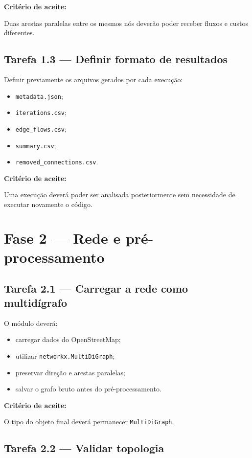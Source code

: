 \documentclass[12pt,a4paper]{article}
\begin{document}
\textbf{Critério de aceite:}

Duas arestas paralelas entre os mesmos nós deverão poder receber fluxos e
custos diferentes.

\subsection{Tarefa 1.3 --- Definir formato de resultados}

Definir previamente os arquivos gerados por cada execução:

\begin{itemize}
    \item \texttt{metadata.json};
    \item \texttt{iterations.csv};
    \item \texttt{edge\_flows.csv};
    \item \texttt{summary.csv};
    \item \texttt{removed\_connections.csv}.
\end{itemize}

\textbf{Critério de aceite:}

Uma execução deverá poder ser analisada posteriormente sem necessidade de
executar novamente o código.

\section{Fase 2 --- Rede e pré-processamento}

\subsection{Tarefa 2.1 --- Carregar a rede como multidígrafo}

O módulo deverá:

\begin{itemize}
    \item carregar dados do OpenStreetMap;
    \item utilizar \texttt{networkx.MultiDiGraph};
    \item preservar direção e arestas paralelas;
    \item salvar o grafo bruto antes do pré-processamento.
\end{itemize}

\textbf{Critério de aceite:}

O tipo do objeto final deverá permanecer \texttt{MultiDiGraph}.

\subsection{Tarefa 2.2 --- Validar topologia}
\end{document}
